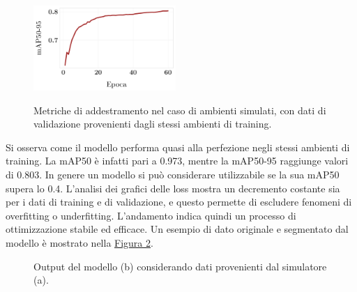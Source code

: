 \documentclass[12pt]{report}
\begin{document}
\begin{figure}[h!]
	\hspace{0.01\textwidth}
	{\includegraphics[width=0.48\textwidth]{images/domain-shift/sim-to-sim/1/map50-95}}
	\caption{Metriche di addestramento nel caso di ambienti simulati, con dati di validazione provenienti dagli stessi ambienti di training.}
	\label{fig:sim-to-sim-graph-1}
\end{figure}

Si osserva come il modello performa quasi alla perfezione negli stessi ambienti di training. La mAP50 è infatti pari a 0.973, mentre la mAP50-95 raggiunge valori di 0.803. In genere un modello si può considerare utilizzabile se la sua mAP50 supera lo 0.4. L'analisi dei grafici delle loss mostra un decremento costante sia per i dati di training e di validazione, e questo permette di escludere fenomeni di overfitting o underfitting. L'andamento indica quindi un processo di ottimizzazione stabile ed efficace. Un esempio di dato originale e segmentato dal modello è mostrato nella \hyperref[fig:sim-to-sim-prediction-1]{Figura \ref{fig:sim-to-sim-prediction-1}}.

\begin{figure}[h!]
	\centering
	\hspace{0.01\textwidth}
	\hspace{0.01\textwidth}
	\caption{Output del modello (b) considerando dati provenienti dal simulatore (a).}
	\label{fig:sim-to-sim-prediction-1}
\end{figure}
\end{document}
